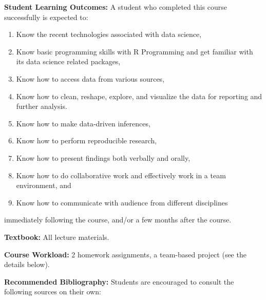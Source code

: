 \documentclass[
  12pt,
]{article}
\providecommand{\tightlist}{%
  \setlength{\itemsep}{0pt}\setlength{\parskip}{0pt}}
\begin{document}
\textbf{Student Learning Outcomes:} A student who completed this course
successfully is expected to:

\begin{enumerate}
\def\labelenumi{\arabic{enumi}.}
\tightlist
\item
  Know the recent technologies associated with data science,
\item
  Know basic programming skills with R Programming and get familiar with
  its data science related packages,
\item
  Know how to access data from various sources,
\item
  Know how to clean, reshape, explore, and visualize the data for
  reporting and further analysis.
\item
  Know how to make data-driven inferences,
\item
  Know how to perform reproducible research,
\item
  Know how to present findings both verbally and orally,
\item
  Know how to do collaborative work and effectively work in a team
  environment, and
\item
  Know how to communicate with audience from different disciplines
\end{enumerate}

immediately following the course, and/or a few months after the course.

\textbf{Textbook:} All lecture materials.

\textbf{Course Workload:} 2 homework assignments, a team-based project
(see the details below).

\textbf{Recommended Bibliography:} Students are encouraged to consult
the following sources on their own:
\end{document}
